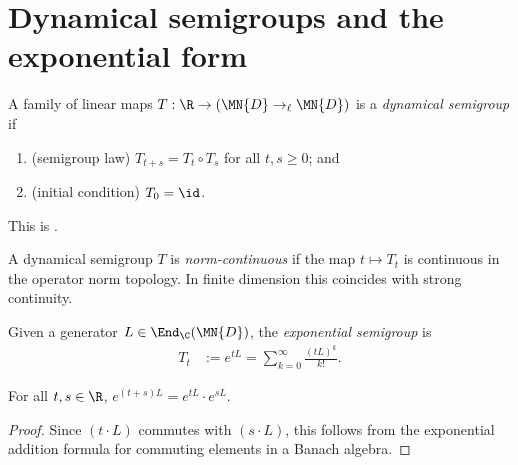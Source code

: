 \section{Dynamical semigroups and the exponential form}
\label{sec:semigroup_defs}

\begin{definition}\label{def:dyn_semigroup_ch12}
    \leanok
    A family of linear maps
    $T : \R \to (\MN{D} \to_{\ell} \MN{D})$
    is a \emph{dynamical semigroup} if
    \begin{enumerate}
        \item (semigroup law) $T_{t+s} = T_t \circ T_s$
              for all $t,s \ge 0$; and
        \item (initial condition) $T_0 = \id$.
    \end{enumerate}
    This is \cite[Equation~(7.1)]{Wolf2012Quantum}.
\end{definition}

\begin{definition}\label{def:continuous_dyn_semigroup_ch12}
    \leanok
    A dynamical semigroup $T$ is \emph{norm-continuous} if the map
    $t \mapsto T_t$ is continuous in the operator norm topology.
    In finite dimension this coincides with strong continuity.
\end{definition}

\begin{definition}\label{def:exp_semigroup_ch12}
    \leanok
    Given a generator $L \in \End_{\C}(\MN{D})$, the
    \emph{exponential semigroup} is
    \begin{align}
        T_t
        &:= e^{tL}
          = \sum_{k=0}^{\infty} \frac{(tL)^k}{k!}.
        \label{eq:semigroup_exp_def}
    \end{align}
\end{definition}

\begin{theorem}\label{thm:expSemigroupCLM_add_ch12}
    \leanok
    For all $t,s \in \R$, $e^{(t+s)L} = e^{tL} \cdot e^{sL}$.
\end{theorem}

\begin{proof}
    \leanok
    Since $(t \cdot L)$ commutes with $(s \cdot L)$, this follows from
    the exponential addition formula for commuting elements in a
    Banach algebra.
\end{proof}

